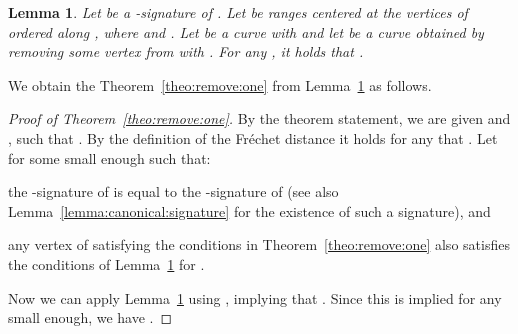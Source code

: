 \documentclass[11pt, letter]{article}
\newtheorem{lemma}[theorem]{Lemma}
\newcommand{\thmref}[1]{Theorem~\ref{theo:#1}}
\newcommand{\lemlab}[1]{\label{lemma:#1}}
\newcommand{\lemref}[1]{Lemma~\ref{lemma:#1}}
\newcommand{\Frechet}{Fr\'echet\xspace}
\begin{document}
\begin{lemma}\lemlab{remove:one}
Let  be a -signature of .
Let  be ranges centered at the vertices of 
ordered along , where  and
. Let  be a curve with
 and let  be a curve obtained by removing 
some vertex  from  with . 
For any , it holds that . 
\end{lemma}

We obtain the \thmref{remove:one} from \lemref{remove:one} as follows. 
\begin{proof}[Proof of \thmref{remove:one}]
By the theorem statement, we are given  and , such that 
. By the definition of the \Frechet distance
 it holds for any  that . 
Let  for some  small enough such that: 
\begin{compactenum}[(i)]
\item the -signature of  is equal to the -signature of  (see also \lemref{canonical:signature} for the existence of such a signature), and
\item any vertex  of  satisfying the conditions in \thmref{remove:one} also 
satisfies the conditions of \lemref{remove:one} for .
\end{compactenum}
Now we can apply \lemref{remove:one} using , implying that .
Since this is implied for any  small enough, we have
. 
\end{proof}
\end{document}
